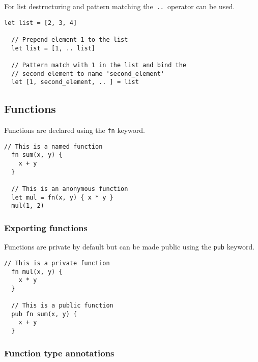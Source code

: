 \vs
For list destructuring and pattern matching the \,\lstinline[language=Gleam, basicstyle=\Large]!..!\,  
operator can be used.

\begin{lstlisting}[belowskip=-\baselineskip]
  let list = [2, 3, 4]

  // Prepend element 1 to the list
  let list = [1, .. list]

  // Pattern match with 1 in the list and bind the
  // second element to name 'second_element' 
  let [1, second_element, .. ] = list
\end{lstlisting}


\vs
\subsection*{\rmfamily Functions}

Functions are declared using the 
\lstinline[language=Gleam, basicstyle=\small]!fn! keyword.

\begin{lstlisting}[belowskip=-\baselineskip]
  // This is a named function
  fn sum(x, y) {
    x + y
  }

  // This is an anonymous function 
  let mul = fn(x, y) { x * y }
  mul(1, 2)
\end{lstlisting}

\vs
\subsubsection*{\rmfamily Exporting functions}

Functions are private by default but can be made public using the 
\lstinline[language=Gleam, basicstyle=\small]!pub! keyword.

\begin{lstlisting}[belowskip=-\baselineskip]
  // This is a private function
  fn mul(x, y) {
    x * y
  }

  // This is a public function
  pub fn sum(x, y) {
    x + y
  }
\end{lstlisting}

\vs
\subsubsection*{\rmfamily Function type annotations}

